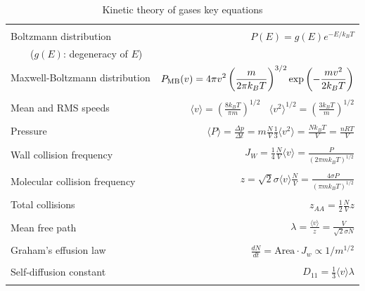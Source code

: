 \documentclass[11pt]{article}
\begin{document}
\begin{table} 
\begin{center}
    \caption{Kinetic theory of gases key equations}
    \begin{tabular}{|lr|}
     \hline
 & \\
Boltzmann distribution & $\displaystyle P(E) = g(E) e^{-E/k_BT}$ \\ \ \ \ \ ($g(E)$: degeneracy of
$E$) & \\ 
Maxwell-Boltzmann distribution & $ \displaystyle
P_{\rm MB}(v) = 4\pi v^2 \left( \frac{m}{2\pi k_B T}\right)^{3/2}\exp\left(-\frac{m
    v^2}{2k_B T}\right) $ \\  & \\
Mean and RMS speeds & 

$\displaystyle \langle v \rangle = \left( \frac{8 k_B T}{\pi m} \right)^{1/2} \ \ \ \ \langle v^2
\rangle^{1/2} = \left( \frac{3 k_B T}{m} \right)^{1/2} $ \\  & \\

Pressure & $
\displaystyle \langle P \rangle = \frac{\Delta p}{\Delta t} = m \frac{N}{V}\frac{1}{3}\langle v^2
\rangle = \frac{N k_B T}{V}=\frac{n R T}{V} $ \\ & \\ 

Wall collision frequency &
$ \displaystyle  J_W = \frac{1}{4}\frac{N}{V}\langle v \rangle=\frac{P}{\left( 2 \pi m k_B
    T\right)^{1/2}} $ \\ & \\

Molecular collision frequency &
$ \displaystyle  z=\sqrt{2} \sigma \langle v \rangle\frac{N}{V} = \frac{4\sigma P}{\left( \pi m k_B T
  \right)^{1/2}} $ \\ & \\

Total collisions &
$ \displaystyle z_{AA} = \frac{1}{2} \frac{N}{V} z$ \\ & \\

Mean free path &
$\displaystyle \lambda = \frac{ \langle v \rangle}{z} = \frac{V}{\sqrt{2} \sigma N} $
\\ & \\

Graham's effusion law & $\displaystyle \frac{dN}{dt}=\text{Area}\cdot  J_w \propto 1/m^{1/2} $
\\ & \\

Self-diffusion constant &
$\displaystyle D_{11} = \frac{1}{3}\langle v \rangle \lambda $ \\ & \\


\end{tabular}
\end{center}
\end{table}
\end{document}
